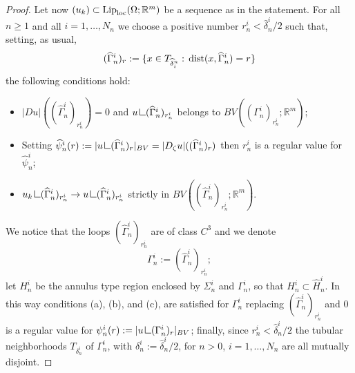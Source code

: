 \documentclass[a4paper,11pt]{article}
\numberwithin{equation}{section}
\newcommand{\Om}{\Omega}
\def\dist{\,{\rm dist}}
\newcommand{\R}{\mathbb{R}}
\newcommand{\res}      {\mathop{\hbox{\vrule height 7pt width .5pt depth
                        0pt\vrule height .5pt width 6pt depth 0pt}}\nolimits}
\begin{document}
\begin{proof}
Let now $(u_k)\subset \text{{\rm Lip}}_{\text{{\rm loc}}}(\Om;\R^m)$ be a sequence as in the statement. For all $n\geq1$ and all $i=1,\dots,N_n$ we choose a positive number $r_n^i<\widehat \delta_n^i/2$ such that, setting, as usual, 
$$(\widehat \Gamma_n^i)_r:=\{x\in T_{\widehat \delta^n_i}:\dist(x, \widehat \Gamma_n^i)=r\}$$
the following conditions hold:
\begin{itemize}
	\item[(a)] $|Du|((\widehat \Gamma_n^i)_{r_n^i})=0$ and $u\res (\widehat \Gamma_n^i)_{r_n^i}$ belongs to $BV((\Gamma_n^i)_{r_n^i};\R^m)$;
	\item[(b)] Setting $\widehat \psi_n^i(r):=|u\res (\widehat \Gamma_n^i)_r|_{BV}=|D_\zeta u|((\widehat \Gamma_n^i)_r)$ then $r_n^i$ is a regular value for $\widehat \psi_n^i$;
	\item[(c)]  $u_k\res (\widehat \Gamma_n^i)_{r_n^i}\rightarrow u\res (\widehat \Gamma_n^i)_{r_n^i}$ strictly in $BV((\widehat \Gamma_n^i)_{r_n^i};\R^m)$.
\end{itemize}
We notice that the loops $(\widehat \Gamma_n^i)_{r^i_n}$ are of class $C^3$ and we denote $$\Gamma_n^i:=(\widehat \Gamma_n^i)_{r^i_n};$$ 
let $H^i_n$ be the annulus type region enclosed by $\Sigma_n^i$ and $\Gamma_n^i$, so that $H_n^i\subset\widehat H_n^i$. In this way conditions (a), (b), and (c), are satisfied for $\Gamma_n^i$ replacing $(\widehat \Gamma_n^i)_{r^i_n}$ and $0$ is a regular value for $\psi_n^i(r):=|u\res (\Gamma_n^i)_r|_{BV}$; finally, since $r_{n}^i<\widehat \delta_n^i/2$ the tubular neighborhoods $T_{\delta_n^i}$ of $\Gamma_{n}^i$, with $\delta_n^i:=\widehat \delta_n^i/2$, for $n>0$, $i=1,\dots,N_n$ are all mutually disjoint.


\end{proof}
\end{document}
